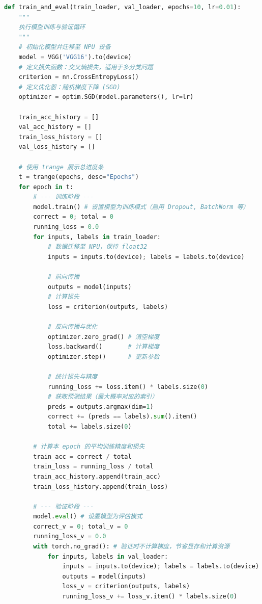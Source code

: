 \begin{lstlisting}[language=Python]
def train_and_eval(train_loader, val_loader, epochs=10, lr=0.01):
    """
    执行模型训练与验证循环
    """
    # 初始化模型并迁移至 NPU 设备
    model = VGG('VGG16').to(device)
    # 定义损失函数：交叉熵损失，适用于多分类问题
    criterion = nn.CrossEntropyLoss()
    # 定义优化器：随机梯度下降 (SGD)
    optimizer = optim.SGD(model.parameters(), lr=lr)

    train_acc_history = []
    val_acc_history = []
    train_loss_history = []
    val_loss_history = []

    # 使用 trange 展示总进度条
    t = trange(epochs, desc="Epochs")
    for epoch in t:
        # --- 训练阶段 ---
        model.train() # 设置模型为训练模式（启用 Dropout, BatchNorm 等）
        correct = 0; total = 0
        running_loss = 0.0
        for inputs, labels in train_loader:
            # 数据迁移至 NPU，保持 float32
            inputs = inputs.to(device); labels = labels.to(device)
            
            # 前向传播
            outputs = model(inputs)
            # 计算损失
            loss = criterion(outputs, labels)
            
            # 反向传播与优化
            optimizer.zero_grad() # 清空梯度
            loss.backward()       # 计算梯度
            optimizer.step()      # 更新参数
            
            # 统计损失与精度
            running_loss += loss.item() * labels.size(0)
            # 获取预测结果（最大概率对应的索引）
            preds = outputs.argmax(dim=1)
            correct += (preds == labels).sum().item()
            total += labels.size(0)
        
        # 计算本 epoch 的平均训练精度和损失
        train_acc = correct / total
        train_loss = running_loss / total
        train_acc_history.append(train_acc)
        train_loss_history.append(train_loss)

        # --- 验证阶段 ---
        model.eval() # 设置模型为评估模式
        correct_v = 0; total_v = 0
        running_loss_v = 0.0
        with torch.no_grad(): # 验证时不计算梯度，节省显存和计算资源
            for inputs, labels in val_loader:
                inputs = inputs.to(device); labels = labels.to(device)
                outputs = model(inputs)
                loss_v = criterion(outputs, labels)
                running_loss_v += loss_v.item() * labels.size(0)
\end{lstlisting}

